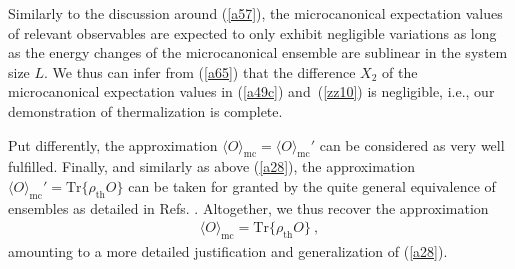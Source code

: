 \documentclass[twocolumn,aps,prb,floatfix,superscriptaddress]{revtex4-2}
\newcommand{\<}{\left\langle}	%
\renewcommand{\>}{\right\rangle}	%
\newcommand{\Pc}{\rho_{\mathrm{th}}}
\newcommand{\tr}{\mbox{Tr}}
\newcommand{\Omc}{\langle O\rangle_{\!\mathrm{mc}}}
\newcommand{\mref}[1]{\ref{#1}}
\begin{document}
Similarly to the discussion around (\ref{a57}),
the microcanonical expectation values of relevant 
observables are expected to only exhibit negligible
variations as long as the energy changes of 
the microcanonical ensemble are sublinear 
in the system size $L$.
We thus can infer from (\ref{a65}) that the difference $X_2$
of the microcanonical expectation values
in (\ref{a49c}) and~(\mref{zz10}) is negligible, i.e., our
demonstration of thermalization is complete.

Put differently, the approximation $\Omc=\Omc'$ 
can be considered as very well fulfilled.
Finally, and similarly as above (\ref{a28}), 
the approximation $\Omc'=\tr\{\Pc O\}$ can 
be taken for granted by the quite general equivalence 
of ensembles as detailed in Refs.
\cite{kuw20a,tas18,bra15}.
Altogether, we thus recover the approximation
\begin{eqnarray}
\Omc= \tr\{\Pc O\}
\ ,
\label{a44}
\end{eqnarray}
amounting to a more detailed justification 
and generalization of (\ref{a28}).
\end{document}
